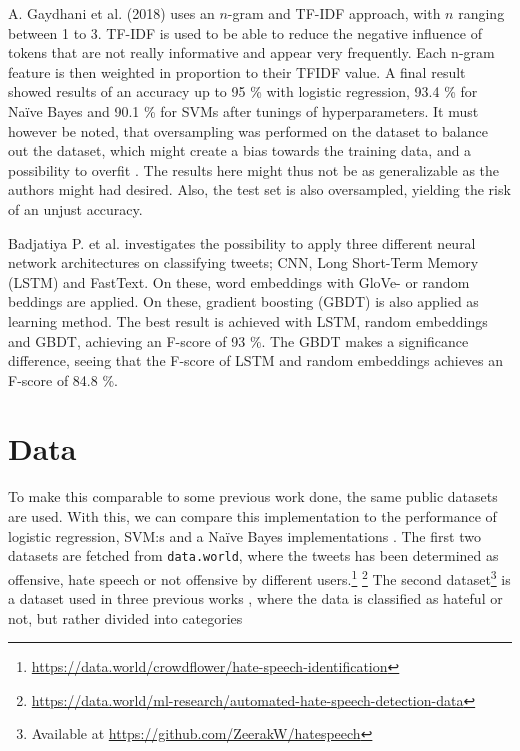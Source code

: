 \documentclass[twocolumn]{article}
\begin{document}
A. Gaydhani et al. (2018) \cite{gaydhani} uses an $n$-gram and TF-IDF approach, with $n$ ranging between 1 to 3. TF-IDF is used to be able to reduce the negative influence of tokens that are not really informative and appear very frequently. Each n-gram feature is then weighted in proportion to their TFIDF value. A final result showed results of an accuracy up to 95 \% with logistic regression, 93.4 \% for Na\"ive Bayes and 90.1 \% for SVMs after tunings of hyperparameters. It must however be noted, that oversampling was performed on the dataset to balance out the dataset, which might create a bias towards the training data, and a possibility to overfit \cite{Weiss2007}. The results here might thus not be as generalizable as the authors might had desired. Also, the test set is also oversampled, yielding the risk of an unjust accuracy. 

Badjatiya P. et al. \cite{DLNN} investigates the possibility to apply three different neural network architectures on classifying tweets; CNN, Long Short-Term Memory (LSTM) and FastText. On these, word embeddings with GloVe- or random beddings are applied. \cite{DLNN} On these, gradient boosting (GBDT) is also applied as learning method. The best result is achieved with LSTM, random embeddings and GBDT, achieving an F-score of 93 \%. The GBDT makes a significance difference, seeing that the F-score of LSTM and random embeddings achieves an F-score of 84.8 \%. 

\section{Data}

To make this comparable to some previous work done, the same public datasets are used. With this, we can compare this implementation to the performance of logistic regression, SVM:s and a Na\"ive Bayes implementations \cite{gaydhani}. The first two datasets are fetched from \verb|data.world|, where the tweets has been determined as offensive, hate speech or not offensive by different users.\footnote{\label{dataset1}\url{https://data.world/crowdflower/hate-speech-identification}} \footnote{\label{dataset2}\url{https://data.world/ml-research/automated-hate-speech-detection-data}} The second dataset\footnote{\label{dataset3} Available at \url{https://github.com/ZeerakW/hatespeech}} is a dataset used in three previous works \cite{gaydhani, Gambck2017,Waseem2016HatefulSO}, where the data is classified as hateful or not, but rather divided into categories 
\end{document}
